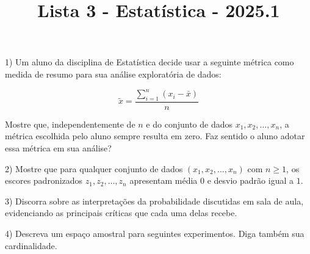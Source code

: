 \documentclass{article}
\title{Lista 3 - Estatística - 2025.1}
\begin{document}
\date{}
\maketitle

1) Um aluno da disciplina de Estatística decide usar a seguinte métrica como medida de resumo para sua análise exploratória de dados:

$$\tilde{x} = \dfrac{\sum_{i=1}^n (x_i - \bar{x})}{n}$$

Mostre que, independentemente de $n$ e do conjunto de dados $x_1, x_2, \dots, x_n$, a métrica escolhida pelo aluno sempre resulta em zero. Faz sentido o aluno adotar essa métrica em sua análise?

\vspace{5px}

2) Mostre que para qualquer conjunto de dados $(x_1, x_2, \dots, x_n)$ com $n \geq 1$, os escores padronizados $z_1, z_2, \dots, z_n$  apresentam média $0$ e desvio padrão igual a $1$. 

\vspace{5px}

3) Discorra sobre as interpretações da probabilidade discutidas em sala de aula, evidenciando as principais críticas que cada uma delas recebe.

\vspace{5px}

4) Descreva um espaço amostral para seguintes experimentos. Diga também sua cardinalidade.
\end{document}
